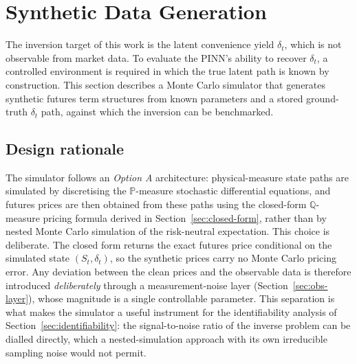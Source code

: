 
\section{Synthetic Data Generation}
\label{sec:synthetic-data}

The inversion target of this work is the latent convenience yield
$\delta_t$, which is not observable from market data. To evaluate the
PINN's ability to recover $\delta_t$, a controlled environment is
required in which the true latent path is known by construction. This
section describes a Monte Carlo simulator that generates synthetic
futures term structures from known parameters and a stored ground-truth
$\delta_t$ path, against which the inversion can be benchmarked.

\subsection{Design rationale}

The simulator follows an \emph{Option A} architecture: physical-measure
state paths are simulated by discretising the $\mathbb{P}$-measure
stochastic differential equations, and futures prices are then obtained
from these paths using the closed-form $\mathbb{Q}$-measure pricing
formula derived in Section~\ref{sec:closed-form}, rather than by nested
Monte Carlo simulation of the risk-neutral expectation. This choice is
deliberate. The closed form returns the exact futures price conditional
on the simulated state $(S_t, \delta_t)$, so the synthetic prices carry
no Monte Carlo pricing error. Any deviation between the clean prices and
the observable data is therefore introduced \emph{deliberately} through a
measurement-noise layer (Section~\ref{sec:obs-layer}), whose magnitude is
a single controllable parameter. This separation is what makes the
simulator a useful instrument for the identifiability analysis of
Section~\ref{sec:identifiability}: the signal-to-noise ratio of the
inverse problem can be dialled directly, which a nested-simulation
approach with its own irreducible sampling noise would not permit.

